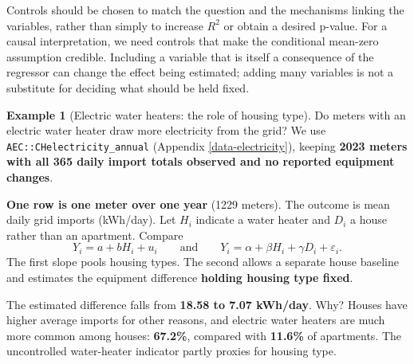 \documentclass[
  11pt,
]{book}
\theoremstyle{definition}
\theoremstyle{definition}
\newtheorem{example}{Example}[chapter]
\theoremstyle{definition}
\theoremstyle{definition}
\theoremstyle{remark}
\begin{document}
Controls should be chosen to match the question and the mechanisms linking the variables, rather than simply to increase \(R^2\) or obtain a desired p-value. For a causal interpretation, we need controls that make the conditional mean-zero assumption credible. Including a variable that is itself a consequence of the regressor can change the effect being estimated; adding many variables is not a substitute for deciding what should be held fixed.


\begin{example}[Electric water heaters: the role of housing type]
\protect\hypertarget{exm:electricity-controls}{}\label{exm:electricity-controls}Do meters with an electric water heater draw more electricity from the grid? We use \texttt{AEC::CHelectricity\_annual} (Appendix \ref{data-electricity}), keeping \textbf{2023 meters with all 365 daily import totals observed and no reported equipment changes}.

\textbf{One row is one meter over one year} (1229 meters). The outcome is mean daily grid imports (kWh/day). Let \(H_i\) indicate a water heater and \(D_i\) a house rather than an apartment. Compare
\[
Y_i=a+bH_i+u_i
\qquad\text{and}\qquad
Y_i=\alpha+\beta H_i+\gamma D_i+\varepsilon_i.
\]
The first slope pools housing types. The second allows a separate house baseline and estimates the equipment difference \textbf{holding housing type fixed}.

\begin{table}[H]
\centering\begingroup\fontsize{10}{12}\selectfont

\endgroup{}
\end{table}

The estimated difference falls from \textbf{18.58 to 7.07 kWh/day}. Why? Houses have higher average imports for other reasons, and electric water heaters are much more common among houses: \textbf{67.2\%}, compared with \textbf{11.6\%} of apartments. The uncontrolled water-heater indicator partly proxies for housing type.


\end{example}
\end{document}
